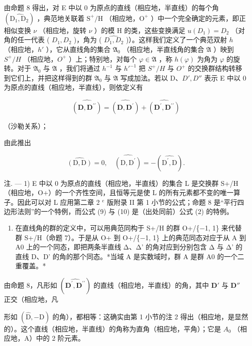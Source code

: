 由命题 8 得出，对 E 中以 0 为原点的直线（相应地，半直线）的每个角 \((\widehat{\mathrm{D}_1,\mathrm{D}_2})\) ，典范地关联着 \(\mathrm{S}^{+}/\mathrm{H}\) （相应地，\(\mathrm{O}^{+}\) ）中一个完全确定的元素，即正相似变换 \(\nu\) （相应地，旋转 \(\nu\) ）的模 H 的类，这些变换满足 \(u(D_1) = D_2\) （对角的任一代表 ( \(D_1, D_2\) )，角为 ( \(\widehat{D_1, D_2}\) )）。这样我们定义了一个典范双射 \(h\) （相应地，\(h'\) ），它从直线角的集合 \(\mathfrak{A}_0\) （相应地，半直线角的集合 \(\mathfrak{A}\) ）映到 \(S^+/H\) （相应地，\(O^+\) ）上；特别地，对每个 \(\varphi \in \mathfrak{A}\) ，称 \(h(\varphi)\) 为角为 \(\varphi\) 的旋转。对于 \(\mathfrak{A}_0\) 与 \(\mathfrak{A}\) ，我们将通过 \(h^{-1}\) 与 \(h'^{-1}\) 把 \(S^+/H\) 与 \(O^+\) 的交换群结构转移到它们上，并把这样得到的群 \(\mathfrak{A}_0\) 与 \(\mathfrak{A}\) 写成加法。若以 D、\(D', D''\) 表示 E 中以 0 为原点的直线（相应地，半直线），则依定义有

\[
\widehat {(\mathbf {D} , \mathbf {D} ^ {\prime \prime})} = \widehat {(\mathbf {D} , \mathbf {D} ^ {\prime})} + \widehat {(\mathbf {D} ^ {\prime} , \mathbf {D} ^ {\prime \prime})}\tag{9}
\]

（沙勒关系）；

由此推出

\[
\widehat {(\mathrm{D} , \mathrm{D})} = 0, \quad \widehat {(\mathrm{D} , \mathrm{D} ^ {\prime})} = - (\widehat {\mathrm{D} ^ {\prime} , \mathrm{D}}).\tag{10}
\]

注. --- 1) E 中以 0 为原点的直线（相应地，半直线）的集合 L 是交换群 S+/H（相应地，O+）的一个齐性空间，且恒等元是使 L 的所有元素都不变的唯一算子。因此可以对 L 应用第二章 2 \(^{e}\) 版附录 II 第 1 小节的公式；命题 8 是“平行四边形法则”的一个特例，而公式 (9) 与 (10) 是（出处同前）公式 (2) 的特例。

\begin{enumerate}
\def\labelenumi{\arabic{enumi})}
\setcounter{enumi}{1}
\tightlist
\item
  在直线角的群的定义中，可以用典范同构于 S+/H 的群 O+/\{−1, 1\} 来代替群 S+/H（命题 7）。于是从 O+ 到 O+/\{−1, 1\} 上的典范同态对应于从 A 到 A0 上的一个同态，即把两条半直线 Δ、Δ' 的角对应到分别包含 Δ 与 Δ' 的直线 D、D' 的角的那个同态。*当域 A 是实数域时，群 A 是群 A0 的一个二重覆盖。*
\end{enumerate}

由命题 8，凡形如 \((\widehat{\mathbf{D}^{\prime},\mathbf{D}^{\prime\prime}})\) 的直线（相应地，半直线）的角，其中 \(\mathbf{D}'\) 与 \(\mathbf{D}''\) 正交（相应地，凡

形如 \((\widehat{\mathrm{D}}, -\mathrm{D})\) 的角），都相等：这确实由第 1 小节的注 2 得出（相应地，是显然的）。这个直线（相应地，半直线）的角称为直角（相应地，平角）；它是 \(A_{0}\) （相应地，A）中的 2 阶元素。


